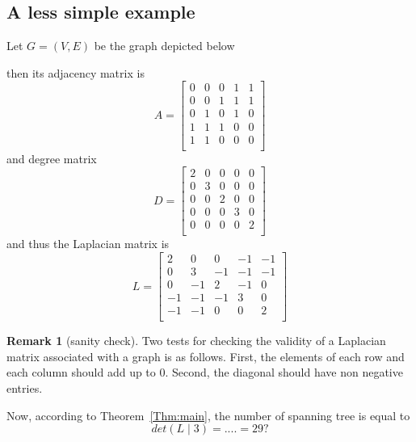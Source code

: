 \documentclass{article}
\theoremstyle{definition}
\newtheorem{remark}{Remark}
\begin{document}
\subsection{A less simple example}

Let $G=(V,E)$ be the  graph depicted below
\begin{center}
\end{center}
then its adjacency matrix is 
$$
A = \begin{bmatrix}
0 & 0 & 0 & 1 & 1 \\
0 & 0 & 1 & 1 & 1 \\
0 & 1 & 0 & 1 & 0 \\
1 & 1 & 1 & 0 & 0 \\
1 & 1 & 0 & 0 & 0 \\
\end{bmatrix}
$$
and degree matrix
$$
D = \begin{bmatrix}
2 & 0 & 0 & 0 & 0 \\
0 & 3 & 0 & 0 & 0 \\
0 & 0 & 2 & 0 & 0 \\
0 & 0 & 0 & 3 & 0 \\
0 & 0 & 0 & 0 & 2 \\
\end{bmatrix}
$$
and thus the Laplacian matrix is 
$$
L = \begin{bmatrix}
2 & 0 & 0 & -1 & -1 \\
0 & 3 & -1 & -1 & -1 \\
0 & -1 & 2 & -1 & 0 \\
-1 & -1 & -1 & 3 & 0 \\
-1 & -1 & 0 & 0 & 2 \\
\end{bmatrix}
$$
\begin{remark}[sanity check]%
    Two tests for checking the validity of a Laplacian matrix associated with a graph is as follows. 
    First, the elements of each row and each column should add up to $0$. 
    Second, the diagonal should have non negative entries.
\end{remark}
Now, according to Theorem~\ref{Thm:main}, the number of spanning tree is equal to 
$$
  det(L\mid 3)=....=29?
$$

 
\end{document}
